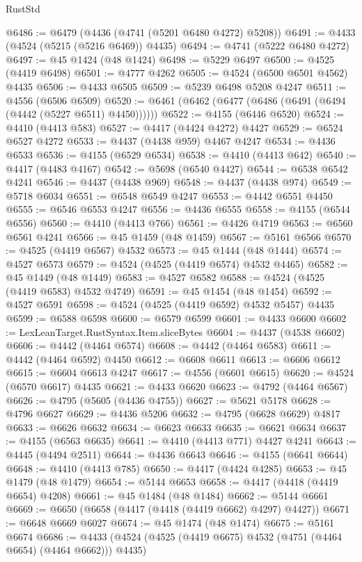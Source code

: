 \begin{lexlean}{RustStd}
\begin{coremodule}
@6486 := @6479 (@4436 (@4741 (@5201 @6480 @4272) @5208))
@6491 := @4433 (@4524 (@5215 (@5216 @6469)) @4435)
@6494 := @4741 (@5222 @6480 @4272)
@6497 := @45 @1424 (@48 @1424)
@6498 := @5229 @6497
@6500 := @4525 (@4419 @6498)
@6501 := @4777 @4262
@6505 := @4524 (@6500 @6501 @4562) @4435
@6506 := @4433 @6505
@6509 := @5239 @6498 @5208 @4247
@6511 := @4556 (@6506 @6509)
@6520 := @6461 (@6462 (@6477 (@6486 (@6491 (@6494 (@4442 (@5227 @6511) @4450))))))
@6522 := @4155 (@6446 @6520)
@6524 := @4410 (@4413 @583)
@6527 := @4417 (@4424 @4272) @4427
@6529 := @6524 @6527 @4272
@6533 := @4437 (@4438 @959) @4467 @4247
@6534 := @4436 @6533
@6536 := @4155 (@6529 @6534)
@6538 := @4410 (@4413 @642)
@6540 := @4417 (@4483 @4167)
@6542 := @5698 (@6540 @4427)
@6544 := @6538 @6542 @4241
@6546 := @4437 (@4438 @969)
@6548 := @4437 (@4438 @974)
@6549 := @5718 @6034
@6551 := @6548 @6549 @4247
@6553 := @4442 @6551 @4450
@6555 := @6546 @6553 @4247
@6556 := @4436 @6555
@6558 := @4155 (@6544 @6556)
@6560 := @4410 (@4413 @766)
@6561 := @4426 @4719
@6563 := @6560 @6561 @4241
@6566 := @45 @1459 (@48 @1459)
@6567 := @5161 @6566
@6570 := @4525 (@4419 @6567) @4532
@6573 := @45 @1444 (@48 @1444)
@6574 := @4527 @6573
@6579 := @4524 (@4525 (@4419 @6574) @4532 @4465)
@6582 := @45 @1449 (@48 @1449)
@6583 := @4527 @6582
@6588 := @4524 (@4525 (@4419 @6583) @4532 @4749)
@6591 := @45 @1454 (@48 @1454)
@6592 := @4527 @6591
@6598 := @4524 (@4525 (@4419 @6592) @4532 @5457) @4435
@6599 := @6588 @6598
@6600 := @6579 @6599
@6601 := @4433 @6600
@6602 := LexLeanTarget.RustSyntax.Item.sliceBytes
@6604 := @4437 (@4538 @6602)
@6606 := @4442 (@4464 @6574)
@6608 := @4442 (@4464 @6583)
@6611 := @4442 (@4464 @6592) @4450
@6612 := @6608 @6611
@6613 := @6606 @6612
@6615 := @6604 @6613 @4247
@6617 := @4556 (@6601 @6615)
@6620 := @4524 (@6570 @6617) @4435
@6621 := @4433 @6620
@6623 := @4792 (@4464 @6567)
@6626 := @4795 (@5605 (@4436 @4755))
@6627 := @5621 @5178
@6628 := @4796 @6627
@6629 := @4436 @5206
@6632 := @4795 (@6628 @6629) @4817
@6633 := @6626 @6632
@6634 := @6623 @6633
@6635 := @6621 @6634
@6637 := @4155 (@6563 @6635)
@6641 := @4410 (@4413 @771) @4427 @4241
@6643 := @4445 (@4494 @2511)
@6644 := @4436 @6643
@6646 := @4155 (@6641 @6644)
@6648 := @4410 (@4413 @785)
@6650 := @4417 (@4424 @4285)
@6653 := @45 @1479 (@48 @1479)
@6654 := @5144 @6653
@6658 := @4417 (@4418 (@4419 @6654) @4208)
@6661 := @45 @1484 (@48 @1484)
@6662 := @5144 @6661
@6669 := @6650 (@6658 (@4417 (@4418 (@4419 @6662) @4297) @4427))
@6671 := @6648 @6669 @6027
@6674 := @45 @1474 (@48 @1474)
@6675 := @5161 @6674
@6686 := @4433 (@4524 (@4525 (@4419 @6675) @4532 (@4751 (@4464 @6654) (@4464 @6662))) @4435)

\end{coremodule}
\end{lexlean}
